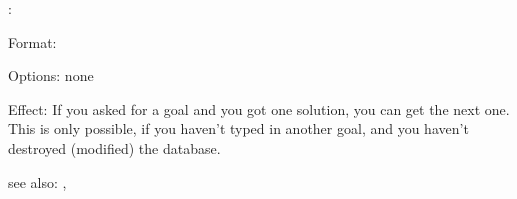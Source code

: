 \more:

Format: 

Options: none

Effect: If you asked for a goal and you got one solution, you can get
	the next one. This is only possible, if you haven't typed in
	another goal, and you haven't destroyed (modified) the database.

see also: \m, \ori
